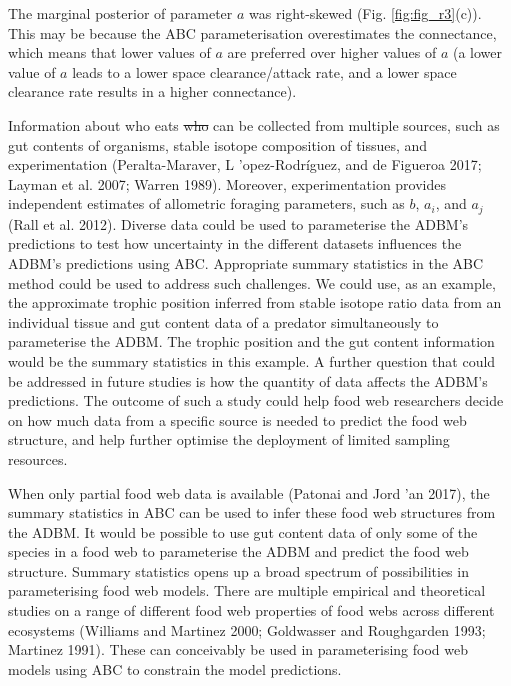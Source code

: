 \documentclass{article}
\providecommand{\DIFaddtex}[1]{{\protect\color{blue}\uwave{#1}}} %
\providecommand{\DIFdeltex}[1]{{\protect\color{red}\sout{#1}}}                      %
\providecommand{\DIFaddbegin}{} %
\providecommand{\DIFaddend}{} %
\providecommand{\DIFdelbegin}{} %
\providecommand{\DIFdelend}{} %
\providecommand{\DIFadd}[1]{\texorpdfstring{\DIFaddtex{#1}}{#1}} %
\providecommand{\DIFdel}[1]{\texorpdfstring{\DIFdeltex{#1}}{}} %
\newcommand{\DIFscaledelfig}{0.5}
\newlength{\DIFdelgraphicswidth} %
\newlength{\DIFdelgraphicsheight} %
\newcommand{\DIFaddincludegraphics}[2][]{{\color{blue}\fbox{\DIFOincludegraphics[#1]{#2}}}} %
\newcommand{\DIFdelincludegraphics}[2][]{%
\sbox{\DIFdelgraphicsbox}{\DIFOincludegraphics[#1]{#2}}%
\settoboxwidth{\DIFdelgraphicswidth}{\DIFdelgraphicsbox} %
\settoboxtotalheight{\DIFdelgraphicsheight}{\DIFdelgraphicsbox} %
\scalebox{\DIFscaledelfig}{%
\parbox[b]{\DIFdelgraphicswidth}{\usebox{\DIFdelgraphicsbox}\\[-\baselineskip] \rule{\DIFdelgraphicswidth}{0em}}\llap{\resizebox{\DIFdelgraphicswidth}{\DIFdelgraphicsheight}{%
\setlength{\unitlength}{\DIFdelgraphicswidth}%
\begin{picture}(1,1)%
\thicklines\linethickness{2pt} %
{\color[rgb]{1,0,0}\put(0,0){\framebox(1,1){}}}%
{\color[rgb]{1,0,0}\put(0,0){\line( 1,1){1}}}%
{\color[rgb]{1,0,0}\put(0,1){\line(1,-1){1}}}%
\end{picture}%
}\hspace*{3pt}}} %
} %
\DeclareRobustCommand{\DIFaddbegin}{\DIFOaddbegin \let\includegraphics\DIFaddincludegraphics} %
\DeclareRobustCommand{\DIFaddend}{\DIFOaddend \let\includegraphics\DIFOincludegraphics} %
\DeclareRobustCommand{\DIFdelbegin}{\DIFOdelbegin \let\includegraphics\DIFdelincludegraphics} %
\DeclareRobustCommand{\DIFdelend}{\DIFOaddend \let\includegraphics\DIFOincludegraphics} %
\begin{document}
The marginal posterior of parameter \(a\) was right-skewed (Fig.
\ref{fig:fig_r3}(c)). This may be because the ABC parameterisation
overestimates the connectance, which means that lower values of \(a\)
are preferred over higher values of \(a\) (a lower value of \(a\) leads
to a lower space clearance/attack rate, and a lower space clearance rate
results in a higher connectance).

Information about who eats \DIFdelbegin \DIFdel{who }\DIFdelend \DIFaddbegin \DIFadd{whom }\DIFaddend can be collected from multiple sources,
such as gut contents of organisms, stable isotope composition of
tissues, and experimentation (Peralta-Maraver, L\DIFdelbegin %
\DIFdelend 'opez-Rodríguez, and de
Figueroa 2017; Layman et al. 2007; Warren 1989). Moreover,
experimentation provides independent estimates of allometric foraging
parameters, such as \(b\), \(a_i\), and \(a_j\) (Rall et al. 2012).
Diverse data could be used to parameterise the ADBM's predictions to
test how uncertainty in the different datasets influences the ADBM's
predictions using ABC. Appropriate summary statistics in the ABC method
could be used to address such challenges. We could use, as an example,
the approximate trophic position inferred from stable isotope ratio data
from an individual tissue and gut content data of a predator
simultaneously to parameterise the ADBM. The trophic position and the
gut content information would be the summary statistics in this example.
A further question that could be addressed in future studies is how the
quantity of data affects the ADBM's predictions. The outcome of such a
study could help food web researchers decide on how much data from a
specific source is needed to predict the food web structure, and help
further optimise the deployment of limited sampling resources.

When only partial food web data is available (Patonai and Jord\DIFdelbegin %
\DIFdelend 'an 2017),
the summary statistics in ABC can be used to infer these food web
structures from the ADBM. It would be possible to use gut content data
of only some of the species in a food web to parameterise the ADBM and
predict the food web structure. Summary statistics opens up a broad
spectrum of possibilities in parameterising food web models. There are
multiple empirical and theoretical studies on a range of different food
web properties of food webs across different ecosystems (Williams and
Martinez 2000; Goldwasser and Roughgarden 1993; Martinez 1991). These
can conceivably be used in parameterising food web models using ABC to
constrain the model predictions.
\end{document}
